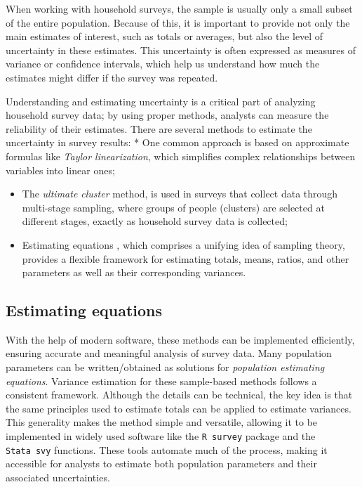 \documentclass[
  12pt,
]{book}
\begin{document}
When working with household surveys, the sample is usually only a small subset of the entire population. Because of this, it is important to provide not only the main estimates of interest, such as totals or averages, but also the level of uncertainty in these estimates. This uncertainty is often expressed as measures of variance or confidence intervals, which help us understand how much the estimates might differ if the survey was repeated.

Understanding and estimating uncertainty is a critical part of analyzing household survey data; by using proper methods, analysts can measure the reliability of their estimates. There are several methods to estimate the uncertainty in survey results:
* One common approach is based on approximate formulas like \emph{Taylor linearization}, which simplifies complex relationships between variables into linear ones;

\begin{itemize}
\item
  The \emph{ultimate cluster} method, is used in surveys that collect data through multi-stage sampling, where groups of people (clusters) are selected at different stages, exactly as household survey data is collected;
\item
  Estimating equations \citep{Binder1983}, which comprises a unifying idea of sampling theory, provides a flexible framework for estimating totals, means, ratios, and other parameters as well as their corresponding variances.
\end{itemize}

\hypertarget{estimating-equations}{%
\subsection{Estimating equations}\label{estimating-equations}}

With the help of modern software, these methods can be implemented efficiently, ensuring accurate and meaningful analysis of survey data. Many population parameters can be written/obtained as solutions for \emph{population estimating equations}. Variance estimation for these sample-based methods follows a consistent framework. Although the details can be technical, the key idea is that the same principles used to estimate totals can be applied to estimate variances. This generality makes the method simple and versatile, allowing it to be implemented in widely used software like the \texttt{R\ survey} package and the \texttt{Stata\ svy} functions. These tools automate much of the process, making it accessible for analysts to estimate both population parameters and their associated uncertainties.
\end{document}
